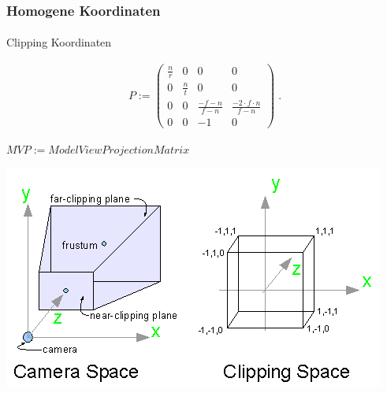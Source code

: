 \documentclass{beamer}
\begin{document}
\begin{frame}
    \frametitle{Homogene Koordinaten}
\framesubtitle{}
\begin{block}{Clipping Koordinaten}

\begin{align*}
P := \begin{pmatrix}  
\frac{n}{r}  &  0 & 0  & 0  \\
0   &  \frac{n}{t} & 0 & 0  \\
0   &  0 & \frac{-f-n}{f-n} & \frac{-2\cdot f \cdot n}{f-n}  \\
0   &  0 & -1 & 0  
\end{pmatrix}  \; .
\end{align*} 


$MVP := Model View Projection Matrix$

\end{block}
\begin{center}
\includegraphics[scale=0.40]{images/projection}
\end{center}
\end{frame}
\end{document}

